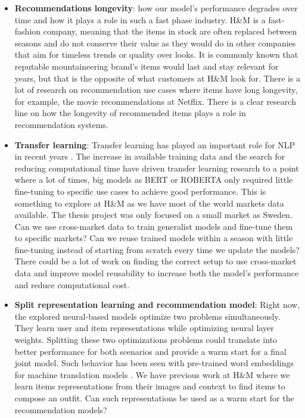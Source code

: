 \documentclass{tex_files/kththesis}
\begin{document}
\begin{itemize}
    \item \textbf{Recommendations longevity}: how our model's performance degrades over time and how it plays a role in such a fast phase industry. H\&M is a fast-fashion company, meaning that the items in stock are often replaced between seasons and do not conserve their value as they would do in other companies that aim for timeless trends or quality over looks. It is commonly known that reputable mountaineering brand's items would last and stay relevant for years, but that is the opposite of what customers at H\&M look for. There is a lot of research on recommendation use cases where items have long longevity, for example, the movie recommendations at Netflix. There is a clear research line on how the longevity of recommended items plays a role in recommendation systems.
    
    \item \textbf{Transfer learning}: Transfer learning has played an important role for NLP in recent years \cite{ruder2019transfer}. The increase in available training data and the search for reducing computational time have driven transfer learning research to a point where a lot of times, big models as BERT or ROBERTA only required little fine-tuning to specific use cases to achieve good performance. This is something to explore at H\&M as we have most of the world markets data available. The thesis project was only focused on a small market as Sweden. Can we use cross-market data to train generalist models and fine-tune them to specific markets? Can we reuse trained models within a season with little fine-tuning instead of starting from scratch every time we update the models? There could be a lot of work on finding the correct setup to use cross-market data and improve model reusability to increase both the model's performance and reduce computational cost.
    
    \item \textbf{ Split representation learning and recommendation model}: Right now, the explored neural-based models optimize two problems simultaneously. They learn user and item representations while optimizing neural layer weights. Splitting these two optimizations problems could translate into better performance for both scenarios and provide a warm start for a final joint model. Such behavior has been seen with pre-trained word embeddings for machine translation models \cite{glove}. We have previous work at H\&M \cite{hm2vec} where we learn items representations from their images and context to find items to compose an outfit. Can such representations be used as a warm start for the recommendation models?
    

\end{itemize}
\end{document}
